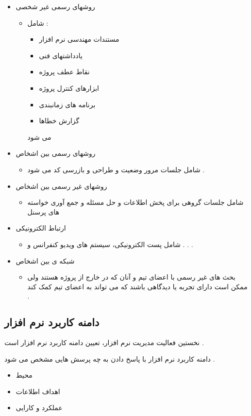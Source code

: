 \documentclass{article}
\begin{document}
\begin{itemize}
	\item روشهای رسمی غیر شخصی
	\begin{itemize}
		\item شامل  : 
		\begin{itemize}
			\item مستندات مهندسی نرم افزار
			\item یادداشتهای فنی
			\item نقاط عطف پروژه
			\item ابزارهای کنترل پروژه
			\item  برنامه های زمانبندی
			\item گزارش خطاها
		\end{itemize}
		  می شود 
	\end{itemize}
	\item روشهای رسمی بین اشخاص
	\begin{itemize}
		\item شامل جلسات مرور وضعیت و طراحی و بازرسی کد می شود .
	\end{itemize}
	\item روشهای غیر رسمی بین اشخاص
	\begin{itemize}
		\item شامل جلسات گروهی برای پخش اطلاعات و حل مسئله و جمع آوری خواسته های پرسنل
	\end{itemize}
	\item ارتباط الکترونیکی
	\begin{itemize}
		\item شامل پست الکترونیکی، سیستم های ویدیو کنفرانس و . . .
	\end{itemize}
	\item شبکه ی بین اشخاص
	\begin{itemize}
		\item بحث های غیر رسمی با اعضای تیم و آنان که در خارج از پروژه هستند ولی ممکن است دارای تجربه یا دیدگاهی باشند که می تواند به اعضای تیم کمک کند .
	\end{itemize}
\end{itemize}




\subsection{دامنه کاربرد نرم افزار}
نخستین فعالیت مدیریت نرم افزار، تعیین دامنه کاربرد نرم افزار است .

دامنه کاربرد نرم افزار با پاسخ دادن به چه پرسش هایی مشخص می شود .

\begin{itemize}
	\item محیط
	\item اهداف اطلاعات
	\item عملکرد و کارایی
\end{itemize}
\end{document}
